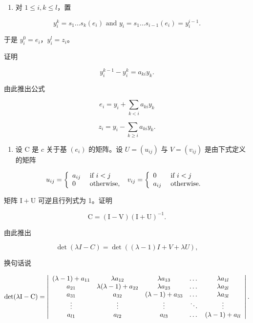 \begin{enumerate}
\def\labelenumi{\alph{enumi})}
\tightlist
\item
  对 \(1 \leqslant i, k \leqslant l\)，置
\end{enumerate}

\[
y _ {i} ^ {k} = s _ {1} \dots s _ {k} (e _ {i}) \text { and } y _ {i} = s _ {1} \dots s _ {i - 1} (e _ {i}) = y _ {i} ^ {i - 1}.
\]

于是 \(y_{i}^{0} = e_{i}\)，\(y_{i}^{l} = z_{i}\)。

证明

\[
y _ {i} ^ {k - 1} - y _ {i} ^ {k} = a _ {k i} y _ {k}.
\]

由此推出公式

\[
e _ {i} = y _ {i} + \sum_ {k <   i} a _ {k i} y _ {k}
\]

\[
z _ {i} = y _ {i} - \sum_ {k \geqslant i} a _ {k i} y _ {k}.
\]

\begin{enumerate}
\def\labelenumi{\alph{enumi})}
\setcounter{enumi}{1}
\tightlist
\item
  设 C 是 \(c\) 关于基 \((e_i)\) 的矩阵。设 \(U = (u_{ij})\) 与 \(V = (v_{ij})\) 是由下式定义的矩阵
\end{enumerate}

\[
u _ {i j} = \left\{ \begin{array}{l l} a _ {i j} & \text { if } i <   j \\ 0 & \text { otherwise, } \end{array} \right. v _ {i j} = \left\{ \begin{array}{l l} 0 & \text { if } i <   j \\ a _ {i j} & \text { otherwise. } \end{array} \right.
\]

矩阵 \(\mathrm{I} + \mathrm{U}\) 可逆且行列式为 1。证明

\[
\mathrm{C} = (\mathrm{I} - \mathrm{V}) (\mathrm{I} + \mathrm{U}) ^ {- 1}.
\]

由此推出

\[
\det (\lambda I - C) = \det ((\lambda - 1) I + V + \lambda U),
\]

换句话说

\[
\det (\lambda \mathrm{I} - \mathrm{C}) = \left| \begin{array}{c c c c c} (\lambda - 1) + a _ {1 1} & \lambda a _ {1 2} & \lambda a _ {1 3} & \dots & \lambda a _ {1 l} \\ a _ {2 1} & \lambda (\lambda - 1) + a _ {2 2} & \lambda a _ {2 3} & \dots & \lambda a _ {2 l} \\ a _ {3 1} & a _ {3 2} & (\lambda - 1) + a _ {3 3} & \dots & \lambda a _ {3 l} \\ \vdots & \vdots & \vdots & \ddots & \vdots \\ a _ {l 1} & a _ {l 2} & a _ {l 3} & \dots & (\lambda - 1) + a _ {l l} \end{array} \right|.
\]

